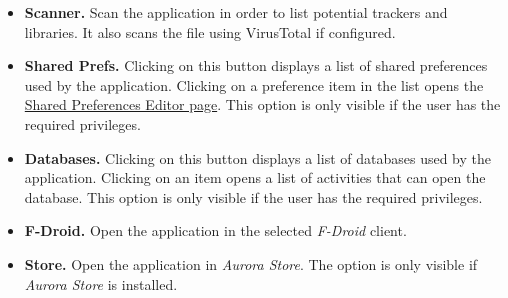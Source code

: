 \begin{itemize}
    \item \textbf{Scanner.} Scan the application in order to list potential trackers and libraries. It also scans the
    file using VirusTotal if configured.\\

    \item \textbf{Shared Prefs.} Clicking on this button displays a list of shared preferences used by the application.
    Clicking on a preference item in the list opens the \hyperref[sec:shared-preferences-editor-page]{Shared Preferences
    Editor page}. This option is only visible if the user has the required privileges.

    \item \textbf{Databases.} Clicking on this button displays a list of databases used by the application. Clicking on
    an item opens a list of activities that can open the database. This option is only visible if the user has the
    required privileges.

    \item \textbf{F-Droid.} Open the application in the selected \textit{F-Droid} client.

    \item \textbf{Store.} Open the application in \textit{Aurora Store}. The option is only visible if \textit{Aurora
    Store} is installed.
\end{itemize}

